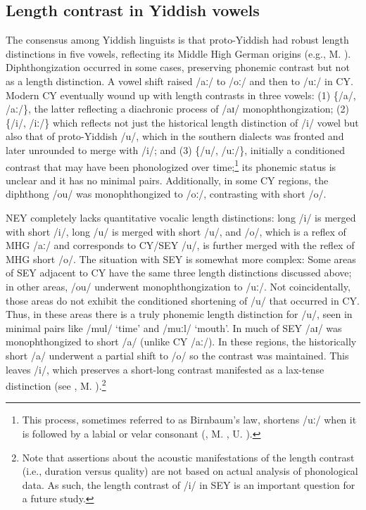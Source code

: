 \documentclass[output=paper,colorlinks,citecolor=brown]{langscibook}
\begin{document}
\subsection{Length contrast in Yiddish vowels}
\label{sec:nove:2.1}

The consensus among Yiddish linguists is that proto\hyp Yiddish had robust length distinctions in five vowels, reflecting its Middle High German origins (e.g., M. \citealt{Weinreich1973}). Diphthongization occurred in some cases, preserving phonemic contrast but not as a length distinction. A vowel shift raised \mbox{/aː/} to \mbox{/oː/} and then to \mbox{/uː/} in CY. Modern CY eventually wound up with length contrasts in three vowels: (1) \{\mbox{/a/}, \mbox{/aː/}\}, the latter reflecting a diachronic process of \mbox{/aɪ/} monophthongization; (2) \{\mbox{/i/}, \mbox{/iː/}\} which reflects not just the historical length distinction of \mbox{/i/} vowel but also that of proto\hyp Yiddish \mbox{/u/}, which in the southern dialects was fronted and later unrounded to merge with \mbox{/i/}; and (3) \{\mbox{/u/}, \mbox{/uː/}\}, initially a conditioned contrast that may have been phonologized over time;\footnote{This process, sometimes referred to as Birnbaum's law, shortens \mbox{/uː/} when it is followed by a labial or velar consonant (\citealt{Birnbaum1934,Birnbaum1979,Jacobs1990,Katz1982}, M. \citealt{Weinreich1973}, U. \citealt{Weinreich1964}).} its phonemic status is unclear and it has no minimal pairs. Additionally, in some CY regions, the diphthong \mbox{/ou/} was monophthongized to \mbox{/oː/}, contrasting with short \mbox{/o/}.

\begin{sloppypar}
NEY completely lacks quantitative vocalic length distinctions: long \mbox{/i/} is merged with short \mbox{/i/}, long \mbox{/u/} is merged with short \mbox{/u/}, and \mbox{/o/}, which is a reflex of MHG \mbox{/aː/} and corresponds to CY/SEY \mbox{/u/}, is further merged with the reflex of MHG short \mbox{/o/}. The situation with SEY is somewhat more complex: Some areas of SEY adjacent to CY have the same three length distinctions discussed above; in other areas, \mbox{/ou/} underwent monophthongization to \mbox{/uː/}. Not coincidentally, those areas do not exhibit the conditioned shortening of \mbox{/u/} that occurred in CY. Thus, in these areas there is a truly phonemic length distinction for \mbox{/u/}, seen in minimal pairs like \mbox{/mul/} `time' and \mbox{/muːl/} `mouth'. In much of SEY \mbox{/aɪ/} was monophthongized to short \mbox{/a/} (unlike CY \mbox{/aː/}). In these regions, the historically short \mbox{/a/} underwent a partial shift to \mbox{/o/} so the contrast was maintained. This leaves \mbox{/i/}, which preserves a short-long contrast manifested as a lax-tense distinction (see \citealt{Glasser2008}, M. \citealt{Weinreich1973}).\footnote{Note that assertions about the acoustic manifestations of the length contrast (i.e., duration versus quality) are not based on actual analysis of phonological data. As such, the length contrast of \mbox{/i/} in SEY is an important question for a future study.}
\end{sloppypar}
\end{document}
